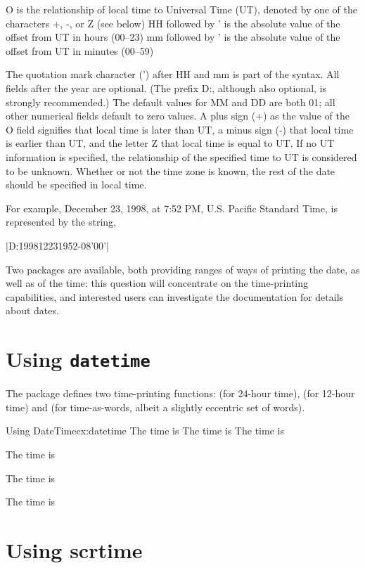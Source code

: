 O is the relationship of local time to Universal Time (UT), denoted by one of the characters +, -, or Z (see below)
HH followed by ' is the absolute value of the offset from UT in hours (00–23)
mm followed by ' is the absolute value of the offset from UT in minutes (00–59)

The quotation mark character (') after HH and mm is part of the syntax. All fields after the year are optional. (The prefix D:, although also optional, is strongly recommended.) The default values for MM and DD are both 01; all other numerical fields default to zero values. A plus sign (+) as the value of the O field signifies that local time is later than UT, a minus sign (-) that local time is earlier than UT, and the letter Z that local time is equal to UT. If no UT information is specified, the relationship of the specified time to UT is considered to be unknown. Whether or not the time zone is known, the rest of the date should be specified in local time.

For example, December 23, 1998, at 7:52 PM, U.S. Pacific Standard Time, is represented by the string,


|D:199812231952-08'00'|


Two packages are available, both providing ranges of ways of printing the date, as well as of the time: this question will concentrate on the time-printing capabilities, and interested users can investigate the documentation for details about dates.


\section*{Using \protect\texttt{datetime}}

The  package defines two time-printing functions: \cmd{\xxivtime} (for 24-hour time), \cmd{\ampmtime} (for 12-hour time) and \cmd{\oclock} (for time-as-words, albeit a slightly eccentric set of words).


\begin{texexample}{Using DateTime}{ex:datetime}
The time is \xxivtime
The time is \ampmtime
The time is \oclock

The time is \xxivtime

The time is \ampmtime

The time is \oclock
\end{texexample}


\section{Using scrtime}

